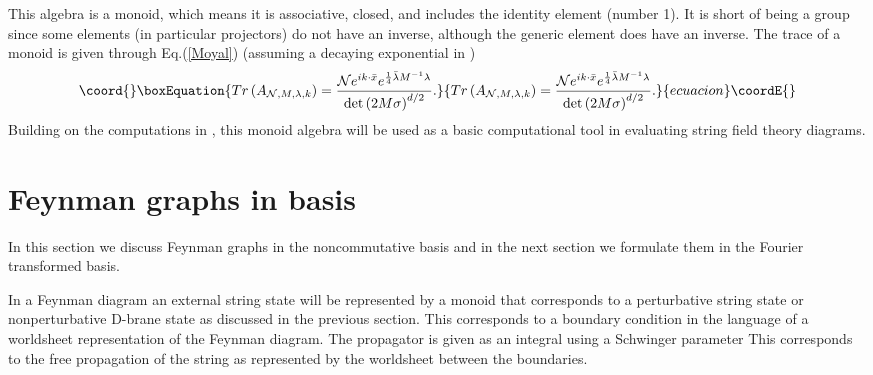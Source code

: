 \documentclass[a4paper,11pt]{article}
\begin{document}
This algebra is a monoid, which means it is associative, closed, and
includes the identity element (number 1). It is short of being a group since
some elements (in particular projectors) do not have an inverse, although
the generic element does have an inverse. The trace of a monoid is given
through Eq.(\ref{Moyal}) (assuming a decaying exponential in \myHighlight{$\xi $}\coordHE{})%
\begin{equation}\coord{}\boxEquation{
Tr\left( A_{\mathcal{N},M,\lambda ,k}\right) =\frac{\mathcal{N}e^{ik\cdot
\bar{x}}e^{\frac{1}{4}\bar{\lambda}M^{-1}\lambda }}{\det \left( 2M\sigma
\right) ^{d/2}}.  \label{trace}
}{
Tr\left( A_{\mathcal{N},M,\lambda ,k}\right) =\frac{\mathcal{N}e^{ik\cdot
\bar{x}}e^{\frac{1}{4}\bar{\lambda}M^{-1}\lambda }}{\det \left( 2M\sigma
\right) ^{d/2}}.  }{ecuacion}\coordE{}\end{equation}%
Building on the computations in \cite{BM2}, this monoid algebra will be used
as a basic computational tool in evaluating string field theory diagrams.

\section{Feynman graphs in \myHighlight{$\protect\xi $}\coordHE{} basis}

In this section we discuss Feynman graphs in the noncommutative \myHighlight{$\xi $}\coordHE{} basis
and in the next section we formulate them in the Fourier transformed basis.

In a Feynman diagram an external string state will be represented by a
monoid \coordHE{} that corresponds to a perturbative
string state or nonperturbative D-brane state as discussed in the previous
section. This corresponds to a boundary condition in the language of a
worldsheet representation of the Feynman diagram. The propagator is given as
an integral using a Schwinger parameter \coordHE{}
This corresponds to the free propagation of the string as represented by the
worldsheet between the boundaries.
\end{document}
